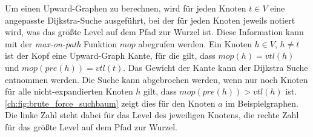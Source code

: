 Um einen Upward-Graphen zu berechnen, wird für jeden Knoten $t \in V$ eine angepasste Dijkstra-Suche ausgeführt, bei der für jeden Knoten jeweils notiert wird, was das größte Level auf dem Pfad zur Wurzel ist.
Diese Information kann mit der \emph{max-on-path} Funktion ${mop}$ abegrufen werden.
Ein Knoten $h \in V$, $h \neq t$ ist der Kopf eine Upward-Graph Kante, für die gilt, dass ${mop}(h) = {vtl}(h)$ und ${mop}({pre}(h)) = {vtl}(t)$.
Das Gewicht der Kante kann der Dijkstra Suche entnommen werden.
Die Suche kann abgebrochen werden, wenn nur noch Knoten für alle nicht-expandierten Knoten $h$ gilt, dass ${mop}({pre}(h)) > {vtl}(h)$ ist.
\autoref{ch:fig:brute_force_suchbaum} zeigt dies für den Knoten $a$ im Beispielgraphen.
Die linke Zahl steht dabei für das Level des jeweiligen Knotens, die rechte Zahl für das größte Level auf dem Pfad zur Wurzel.

